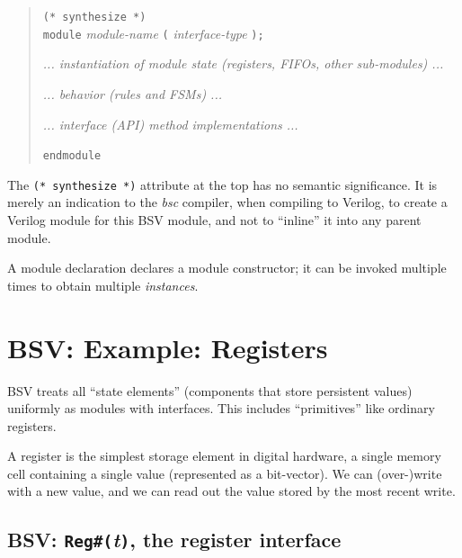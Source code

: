 \begin{quote}
{\tt (* synthesize *)} \\
{\tt module} \emph{module-name} {\tt (} \emph{interface-type} {\tt );}

\hmm \emph{... instantiation of module state (registers, FIFOs, other sub-modules) ...}

\hmm \emph{... behavior (rules and FSMs) ...}

\hmm \emph{... interface (API) method implementations ...}

{\tt endmodule}
\end{quote}


The \verb|(* synthesize *)| attribute at the top has no semantic
significance.  It is merely an indication to the \emph{bsc} compiler,
when compiling to Verilog, to create a Verilog module for this BSV
module, and not to ``inline'' it into any parent module.


A module declaration declares a module constructor; it can be invoked
multiple times to obtain multiple \emph{instances}.


\section{BSV: Example: Registers}


BSV treats all ``state elements'' (components that store persistent
values) uniformly as modules with interfaces.  This includes
``primitives'' like ordinary registers.

A register is the simplest storage element in digital hardware, a
single memory cell containing a single value (represented as a
bit-vector).  We can (over-)write with a new value, and we can read
out the value stored by the most recent write.


\subsection{BSV: {\tt Reg\#(}\emph{t}{\tt )}, the register interface}

\label{Sec_CPU_Module_Skeleton_Register_interface}

